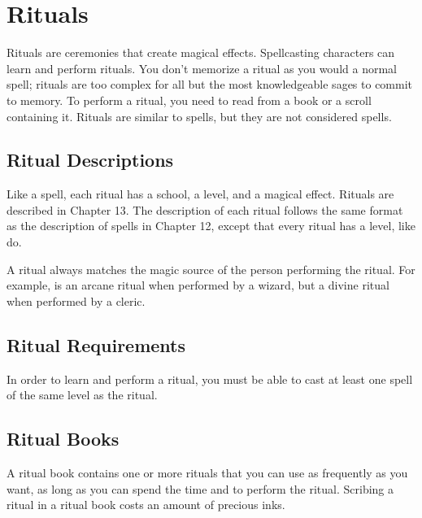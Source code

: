 \section{Rituals}\label{Rituals}
    Rituals are ceremonies that create magical effects.
    Spellcasting characters can learn and perform rituals.
    You don't memorize a ritual as you would a normal spell; rituals are too complex for all but the most knowledgeable sages to commit to memory.
    To perform a ritual, you need to read from a book or a scroll containing it.
    Rituals are similar to spells, but they are not considered spells.
    \subsection{Ritual Descriptions}
        \par Like a spell, each ritual has a school, a level, and a magical effect.
        Rituals are described in Chapter 13. The description of each ritual follows the same format as the description of spells in Chapter 12, except that every ritual has a level, like  do.

        A ritual always matches the magic source of the person performing the ritual.
        For example,  is an arcane ritual when performed by a wizard, but a divine ritual when performed by a cleric.
    \subsection{Ritual Requirements}
        In order to learn and perform a ritual, you must be able to cast at least one spell of the same level as the ritual.
    \subsection{Ritual Books}
        A ritual book contains one or more rituals that you can use as frequently as you want, as long as you can spend the time and  to perform the ritual.
        Scribing a ritual in a ritual book costs an amount of precious inks.
